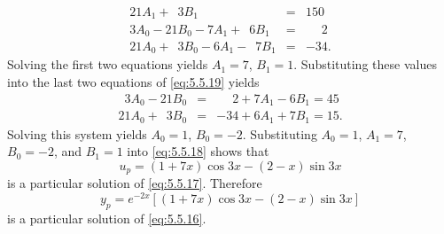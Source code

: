 \begin{examplesolution}
\begin{equation}
\begin{array}{rcr}
    21A_{1}+\phantom{2}3B_{1}                          & = & 150\phantom{.}           \\
    3A_{0}-21B_{0}-7A_{1}+\phantom{2}6B_{1}            & = & \phantom{-3}2\phantom{.} \\
    21A_{0}+\phantom{2}3B_{0}-6A_{1}-\phantom{5}7B_{1} & = & -34.
  \end{array}
\end{equation}
Solving the first two equations yields $A_{1}=7$, $B_{1}=1$. Substituting these values into the last
two equations of \eqref{eq:5.5.19} yields
\begin{eqnarray*}
  \phantom{2}3A_{0}-21B_{0} & = & \phantom{-3}2+7A_{1}-6B_{1}=45\phantom{.} \\
  21A_{0}+\phantom{2}3B_{0} & = & -34+6A_{1}+7B_{1}=15.
\end{eqnarray*}
Solving this system yields $A_{0}=1$, $B_{0}=-2$. Substituting $A_{0}=1$, $A_{1}=7$, $B_{0}=-2$, and
$B_{1}=1$ into \eqref{eq:5.5.18} shows that
\[
  u_{p}=(1+7x)\cos3x-(2-x)\sin3x
\]
is a particular solution of \eqref{eq:5.5.17}. Therefore
\[
  y_{p}=e^{-2x}\left[(1+7x)\cos3x-(2-x)\sin3x\right]
\]
is a particular solution of \eqref{eq:5.5.16}.
\end{examplesolution}

